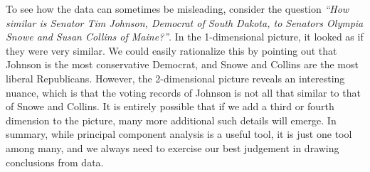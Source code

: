 \documentclass{ximera}
\begin{document}
To see how the data can sometimes be misleading, consider the question
{\em ``How similar is Senator Tim Johnson, Democrat of South Dakota,
  to Senators Olympia Snowe and Susan Collins of Maine?''}. In the
1-dimensional picture, it looked as if they were very similar. We
could easily rationalize this by pointing out that Johnson is the most
conservative Democrat, and Snowe and Collins are the most liberal
Republicans. However, the 2-dimensional picture reveals an interesting
nuance, which is that the voting records of Johnson is not all that
similar to that of Snowe and Collins. It is entirely possible that if
we add a third or fourth dimension to the picture, many more
additional such details will emerge. In summary, while principal
component analysis is a useful tool, it is just one tool among many,
and we always need to exercise our best judgement in drawing
conclusions from data.
\end{document}
